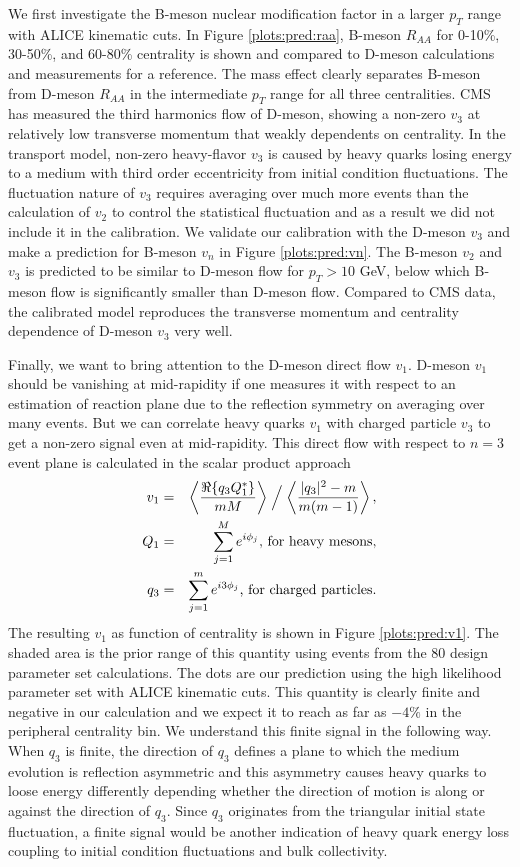\documentclass[aps, prc, reprint, amsmath, groupedaddress, nofootinbib]{revtex4-1}
\begin{document}
We first investigate the B-meson nuclear modification factor in a larger $p_T$ range with ALICE kinematic cuts.
In Figure \ref{plots:pred:raa}, B-meson $R_{AA}$ for 0-10\%, 30-50\%, and 60-80\% centrality is shown and compared to D-meson calculations and measurements for a reference.
The mass effect clearly separates B-meson from D-meson $R_{AA}$ in the intermediate $p_T$ range for all three centralities. 
CMS has measured the third harmonics flow of D-meson, showing a non-zero $v_3$ at relatively low transverse momentum that weakly dependents on centrality.
In the transport model, non-zero heavy-flavor $v_3$ is caused by heavy quarks losing energy to a medium with third order eccentricity from initial condition fluctuations.
The fluctuation nature of $v_3$ requires averaging over much more events than the calculation of $v_2$ to control the statistical fluctuation and as a result we did not include it in the calibration.
We validate our calibration with the D-meson $v_3$ and make a prediction for B-meson $v_n$ in Figure \ref{plots:pred:vn}.
The B-meson $v_2$ and $v_3$ is predicted to be similar to D-meson flow for $p_T > 10$ GeV, below which B-meson flow is significantly smaller than D-meson flow.
Compared to CMS data, the calibrated model reproduces the transverse momentum and centrality dependence of D-meson $v_3$ very well.

Finally, we want to bring attention to the D-meson direct flow $v_1$.
D-meson $v_1$ should be vanishing at mid-rapidity if one measures it with respect to an estimation of reaction plane due to the reflection symmetry on averaging over many events.
But we can correlate heavy quarks $v_1$ with charged particle $v_3$ to get a non-zero signal even at mid-rapidity.
This direct flow with respect to $n=3$ event plane is calculated in the scalar product approach
\begin{eqnarray}
v_1 &=& \left\langle \frac{\Re\{q_3 Q_1^*\}}{mM} \right\rangle\Bigm/\left\langle \frac{|q_3|^2-m}{m(m-1)} \right\rangle,\\
Q_1 &=& \sum_{j=1}^{M}e^{i\phi_j} \textrm{, for heavy mesons},\nonumber\\
q_3 &=& \sum_{j=1}^{m}e^{i3\phi_j} \textrm{, for charged particles}. \nonumber
\end{eqnarray}
The resulting $v_1$ as function of centrality is shown in Figure \ref{plots:pred:v1}.
The shaded area is the prior range of this quantity using events from the 80 design parameter set calculations.
The dots are our prediction using the high likelihood parameter set with ALICE kinematic cuts.
This quantity is clearly finite and negative in our calculation and we expect it to reach as far as $-4\%$ in the peripheral centrality bin.
We understand this finite signal in the following way. 
When $q_3$ is finite, the direction of $q_3$ defines a plane to which the medium evolution is reflection asymmetric and this asymmetry causes heavy quarks to loose energy differently depending whether the direction of motion is along or against the direction of $q_3$.
Since $q_3$ originates from the triangular initial state fluctuation, a finite signal would be another indication of heavy quark energy loss coupling to initial condition fluctuations and bulk collectivity.
\end{document}
